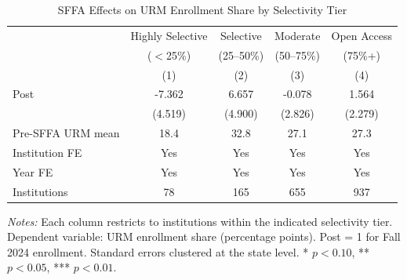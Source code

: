 \begin{table}[htbp]
\centering
\caption{SFFA Effects on URM Enrollment Share by Selectivity Tier}
\label{tab:tiers}
\begin{threeparttable}
\begin{tabular}{lcccc}
\toprule
 & Highly Selective & Selective & Moderate & Open Access \\
 & ($<$25\%) & (25--50\%) & (50--75\%) & (75\%+) \\
 & (1) & (2) & (3) & (4) \\
\midrule
Post & -7.362 & 6.657 & -0.078 & 1.564 \\
 & (4.519) & (4.900) & (2.826) & (2.279) \\
\midrule
Pre-SFFA URM mean & 18.4 & 32.8 & 27.1 & 27.3 \\
Institution FE & Yes & Yes & Yes & Yes \\
Year FE & Yes & Yes & Yes & Yes \\
Institutions & 78 & 165 & 655 & 937 \\
\bottomrule
\end{tabular}
\begin{tablenotes}[flushleft]\small
\item \textit{Notes:} Each column restricts to institutions within the indicated selectivity tier. Dependent variable: URM enrollment share (percentage points). Post = 1 for Fall 2024 enrollment. Standard errors clustered at the state level. * $p < 0.10$, ** $p < 0.05$, *** $p < 0.01$.
\end{tablenotes}
\end{threeparttable}
\end{table}
